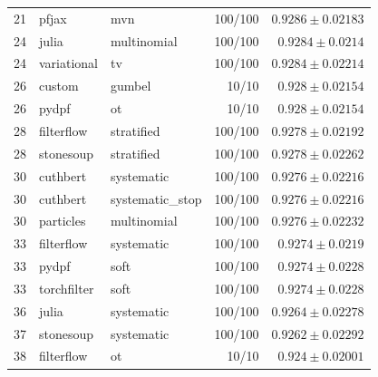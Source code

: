 \begin{table}[!htbp]
\begin{tabular}{rllrr}
21 & pfjax & mvn & 100/100 & $0.9286 \pm 0.02183$ \\
24 & julia & multinomial & 100/100 & $0.9284 \pm 0.0214$ \\
24 & variational & tv & 100/100 & $0.9284 \pm 0.02214$ \\
26 & custom & gumbel & 10/10 & $0.928 \pm 0.02154$ \\
26 & pydpf & ot & 10/10 & $0.928 \pm 0.02154$ \\
28 & filterflow & stratified & 100/100 & $0.9278 \pm 0.02192$ \\
28 & stonesoup & stratified & 100/100 & $0.9278 \pm 0.02262$ \\
30 & cuthbert & systematic & 100/100 & $0.9276 \pm 0.02216$ \\
30 & cuthbert & systematic\_stop & 100/100 & $0.9276 \pm 0.02216$ \\
30 & particles & multinomial & 100/100 & $0.9276 \pm 0.02232$ \\
33 & filterflow & systematic & 100/100 & $0.9274 \pm 0.0219$ \\
33 & pydpf & soft & 100/100 & $0.9274 \pm 0.0228$ \\
33 & torchfilter & soft & 100/100 & $0.9274 \pm 0.0228$ \\
36 & julia & systematic & 100/100 & $0.9264 \pm 0.02278$ \\
37 & stonesoup & systematic & 100/100 & $0.9262 \pm 0.02292$ \\
38 & filterflow & ot & 10/10 & $0.924 \pm 0.02001$ \\
\bottomrule
\end{tabular}
\end{table}

